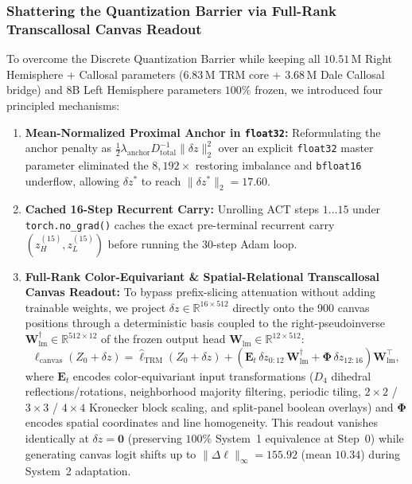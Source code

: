 \documentclass[11pt,a4paper]{article}
\theoremstyle{plain}
\theoremstyle{definition}
\theoremstyle{remark}
\begin{document}
\subsubsection{Shattering the Quantization Barrier via Full-Rank Transcallosal Canvas Readout}
To overcome the Discrete Quantization Barrier while keeping all $10.51$\,M Right Hemisphere + Callosal parameters ($6.83$\,M TRM core + $3.68$\,M Dale Callosal bridge) and 8B Left Hemisphere parameters $100\%$ frozen, we introduced four principled mechanisms:
\begin{enumerate}
    \item \textbf{Mean-Normalized Proximal Anchor in \texttt{float32}:} Reformulating the anchor penalty as $\frac{1}{2}\lambda_{\mathrm{anchor}} D_{\mathrm{total}}^{-1} \|\delta z\|_2^2$ over an explicit \texttt{float32} master parameter eliminated the $8{,}192\times$ restoring imbalance and \texttt{bfloat16} underflow, allowing $\delta z^*$ to reach $\|\delta z^*\|_2 = 17.60$.
    \item \textbf{Cached 16-Step Recurrent Carry:} Unrolling ACT steps $1 \dots 15$ under \texttt{torch.no\_grad()} caches the exact pre-terminal recurrent carry $(z_H^{(15)}, z_L^{(15)})$ before running the 30-step Adam loop.
    \item \textbf{Full-Rank Color-Equivariant \& Spatial-Relational Transcallosal Canvas Readout:} To bypass prefix-slicing attenuation without adding trainable weights, we project $\delta z \in \mathbb{R}^{16 \times 512}$ directly onto the 900 canvas positions through a deterministic basis coupled to the right-pseudoinverse $\mathbf{W}_{\mathrm{lm}}^\dagger \in \mathbb{R}^{512 \times 12}$ of the frozen output head $\mathbf{W}_{\mathrm{lm}} \in \mathbb{R}^{12 \times 512}$:
    \begin{equation}
        \ell_{\mathrm{canvas}}(Z_0 + \delta z) = \hat{\ell}_{\mathrm{TRM}}(Z_0 + \delta z) + \left(\mathbf{E}_t \, \delta z_{0:12} \, \mathbf{W}_{\mathrm{lm}}^\dagger + \mathbf{\Phi} \, \delta z_{12:16}\right) \mathbf{W}_{\mathrm{lm}}^\top,
    \end{equation}
    where $\mathbf{E}_t$ encodes color-equivariant input transformations ($D_4$ dihedral reflections/rotations, neighborhood majority filtering, periodic tiling, $2\times 2$ / $3\times 3$ / $4\times 4$ Kronecker block scaling, and split-panel boolean overlays) and $\mathbf{\Phi}$ encodes spatial coordinates and line homogeneity. This readout vanishes identically at $\delta z = \mathbf{0}$ (preserving $100\%$ System~1 equivalence at Step~0) while generating canvas logit shifts up to $\|\Delta \ell\|_\infty = 155.92$ (mean $10.34$) during System~2 adaptation.

\end{enumerate}
\end{document}
